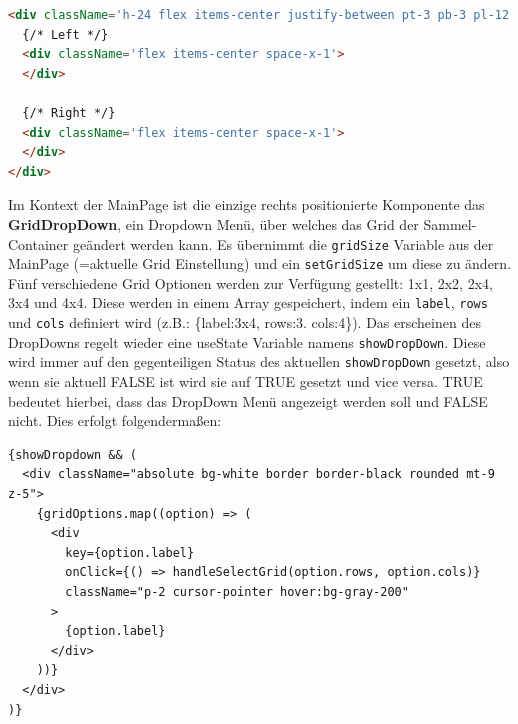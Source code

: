 \documentclass[
    headings=optiontotocandhead,%
    twoside,
    numbers=noenddot,%
    12pt, %
    titlepage, %
    parskip=full, %
    listof=leveldown, 
    numbers=noenddot, %
    a4paper,DIV=14,
    BCOR=15mm,
]{scrbook}
\newcommand{\passthrough}[1]{#1}
\begin{document}
\begin{lstlisting}[language=HTML, caption={Wie die Topbar die Komponente linksbündig und rechtsbündig plartziert werden}]
<div className='h-24 flex items-center justify-between pt-3 pb-3 pl-12 pr-12'>
  {/* Left */}
  <div className='flex items-center space-x-1'>
  </div>

  {/* Right */}
  <div className='flex items-center space-x-1'>
  </div>
</div>
\end{lstlisting}

Im Kontext der MainPage ist die einzige rechts positionierte Komponente
das \textbf{GridDropDown}, ein Dropdown Menü, über welches das Grid der
Sammel-Container geändert werden kann. Es übernimmt die
\passthrough{\lstinline!gridSize!} Variable aus der MainPage (=aktuelle
Grid Einstellung) und ein \passthrough{\lstinline!setGridSize!} um diese
zu ändern. Fünf verschiedene Grid Optionen werden zur Verfügung
gestellt: 1x1, 2x2, 2x4, 3x4 und 4x4. Diese werden in einem Array
gespeichert, indem ein \passthrough{\lstinline!label!},
\passthrough{\lstinline!rows!} und \passthrough{\lstinline!cols!}
definiert wird (z.B.: \{label:3x4, rows:3. cols:4\}). Das erscheinen des
DropDowns regelt wieder eine useState Variable namens
\passthrough{\lstinline!showDropDown!}. Diese wird immer auf den
gegenteiligen Status des aktuellen
\passthrough{\lstinline!showDropDown!} gesetzt, also wenn sie aktuell
FALSE ist wird sie auf TRUE gesetzt und vice versa. TRUE bedeutet
hierbei, dass das DropDown Menü angezeigt werden soll und FALSE nicht.
Dies erfolgt folgendermaßen:

\begin{lstlisting}[caption={Aufscheinen des Drop Down Menü basierend auf boolean showDropDown}]
{showDropdown && (
  <div className="absolute bg-white border border-black rounded mt-9 z-5">
    {gridOptions.map((option) => (
      <div
        key={option.label}
        onClick={() => handleSelectGrid(option.rows, option.cols)}
        className="p-2 cursor-pointer hover:bg-gray-200"
      >
        {option.label}
      </div>
    ))}
  </div>
)}
\end{lstlisting}
\end{document}
